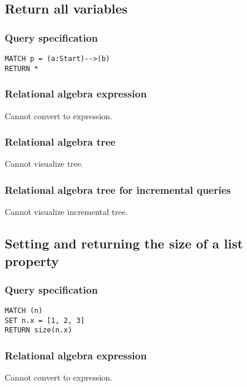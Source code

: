 \subsection{Return all variables}

\subsubsection*{Query specification}

\begin{lstlisting}
MATCH p = (a:Start)-->(b)
RETURN *
\end{lstlisting}

\subsubsection*{Relational algebra expression}

Cannot convert to expression.

\subsubsection*{Relational algebra tree}

Cannot visualize tree.

\subsubsection*{Relational algebra tree for incremental queries}

Cannot visualize incremental tree.

\subsection{Setting and returning the size of a list property}

\subsubsection*{Query specification}

\begin{lstlisting}
MATCH (n)
SET n.x = [1, 2, 3]
RETURN size(n.x)
\end{lstlisting}

\subsubsection*{Relational algebra expression}

Cannot convert to expression.

